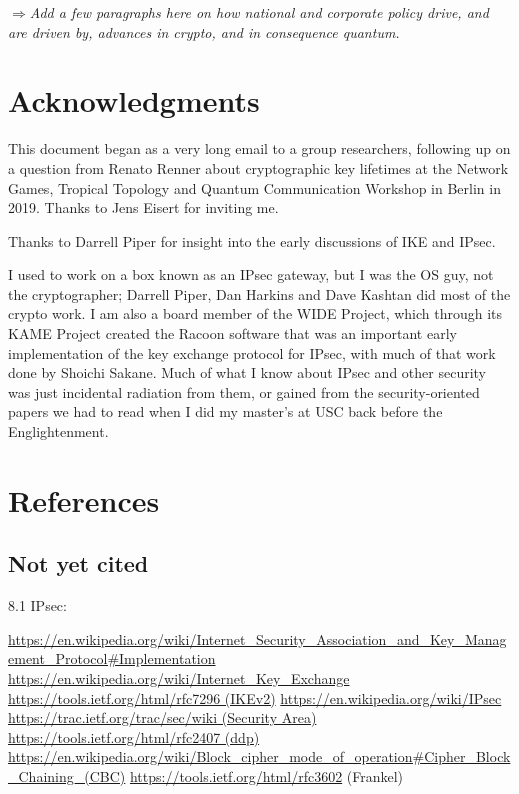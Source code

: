 \documentclass[%
 aip,
 jmp,%
 amsmath,amssymb,
 reprint,%
]{revtex4-1}
\def\comment#1{{\color{ForestGreen}$\Rightarrow${\small\em #1}}}
\begin{document}
\comment{Add a few paragraphs here on how national and corporate
  policy drive, and are driven by, advances in crypto, and in
  consequence quantum.}

\section*{Acknowledgments}

This document began as a very long email to a group researchers,
following up on a question from Renato Renner about cryptographic key
lifetimes at the Network Games, Tropical Topology and Quantum
Communication Workshop in Berlin in 2019.  Thanks to Jens Eisert for
inviting me.

Thanks to Darrell Piper for insight into the early discussions of IKE
and IPsec.

I used to work on a box known as an IPsec gateway, but I was the OS
guy, not the cryptographer; Darrell Piper, Dan Harkins and Dave
Kashtan did most of the crypto work.  I am also a board member of the
WIDE Project, which through its KAME Project created the Racoon
software that was an important early implementation of the key
exchange protocol for IPsec, with much of that work done by Shoichi
Sakane.  Much of what I know about IPsec and other security was just
incidental radiation from them, or gained from the security-oriented
papers we had to read when I did my master's at USC back before the
Englightenment.

\section{References}



\subsection{Not yet cited}

8.1 IPsec:

\url{https://en.wikipedia.org/wiki/Internet_Security_Association_and_Key_Management_Protocol#Implementation}
\url{https://en.wikipedia.org/wiki/Internet_Key_Exchange}
\url{https://tools.ietf.org/html/rfc7296 (IKEv2)}
\url{https://en.wikipedia.org/wiki/IPsec}
\url{https://trac.ietf.org/trac/sec/wiki (Security Area)}
\url{https://tools.ietf.org/html/rfc2407 (ddp)}
\url{https://en.wikipedia.org/wiki/Block_cipher_mode_of_operation#Cipher_Block_Chaining_(CBC)}
\url{https://tools.ietf.org/html/rfc3602} (Frankel)
\end{document}
